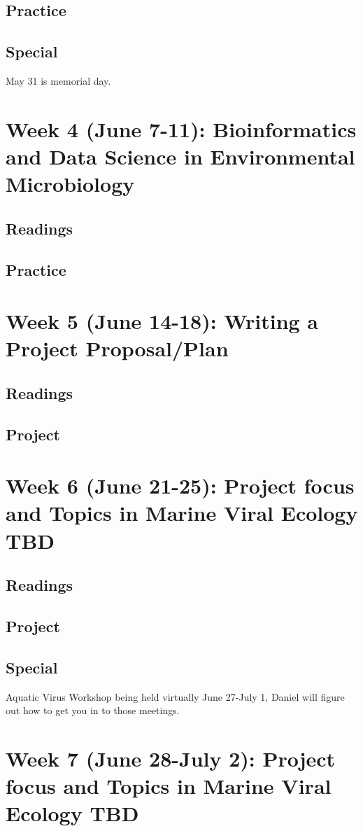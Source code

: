 \documentclass[11pt]{amsart}
\begin{document}
\subsection{Practice}
\subsection{Special} May 31 is memorial day. 
\section{Week 4 (June 7-11): Bioinformatics and Data Science in Environmental Microbiology}
\subsection{Readings}
\subsection{Practice}
\section{Week 5 (June 14-18): Writing a Project Proposal/Plan}
\subsection{Readings}
\subsection{Project}
\section{Week 6 (June 21-25): Project focus and Topics in Marine Viral Ecology TBD}
\subsection{Readings}
\subsection{Project}
\subsection{Special} Aquatic Virus Workshop being held virtually June 27-July 1, Daniel will figure out how to get you in to those meetings. 
\section{Week 7 (June 28-July 2): Project focus and Topics in Marine Viral Ecology TBD}
\end{document}
